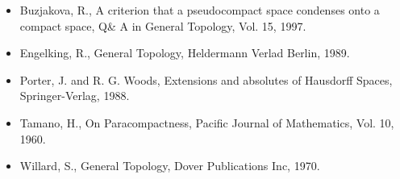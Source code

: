 \documentclass{article}
\begin{document}
																																																				\begin{itemize}
																																																				\item Buzjakova, R., A criterion that a pseudocompact space condenses onto a compact space, Q\& A in General Topology, Vol. 15, 1997.
																																																				\item Engelking, R., General Topology, Heldermann Verlad Berlin, 1989.
																																																				\item Porter, J. and R. G. Woods, Extensions and absolutes of Hausdorff Spaces, Springer-Verlag, 1988.
																																																				\item Tamano, H., On Paracompactness, Pacific Journal of Mathematics, Vol. 10, 1960. 
																																																				\item Willard, S., General Topology, Dover Publications Inc, 1970.
																																																				\end{itemize}














																																																				
\end{document}
